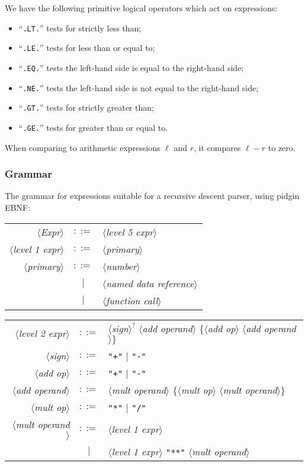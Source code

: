 We have the following primitive logical operators which act on expressions:
\begin{itemize}
\item ``\texttt{.LT.}'' tests for strictly less than;
\item ``\texttt{.LE.}'' tests for less than or equal to;
\item ``\texttt{.EQ.}'' tests the left-hand side is equal to the
  right-hand side;
\item ``\texttt{.NE.}'' tests the left-hand side is not equal to the
  right-hand side;
\item ``\texttt{.GT.}'' tests for strictly greater than;
\item ``\texttt{.GE.}'' tests for greater than or equal to.
\end{itemize}
When comparing to arithmetic expressions $\ell$ and $r$, it compares
$\ell-r$ to zero.

\subsubsection{Grammar}
The grammar for expressions suitable for a recursive descent parser,
using pidgin EBNF:

\begin{tabular}{rcl}
$\langle$\textit{Expr}$\rangle$ & $::=$ & $\langle$\textit{level 5 expr}$\rangle$\\
$\langle$\textit{level 1 expr}$\rangle$ & $::=$ & $\langle$\textit{primary}$\rangle$\\
$\langle$\textit{primary}$\rangle$ & $::=$ & $\langle$\textit{number}$\rangle$\\
  & $\mid$ & $\langle$\textit{named data reference}$\rangle$\\
  & $\mid$ & $\langle$\textit{function call}$\rangle$\\
\end{tabular}

\begin{tabular}{rcl}
  $\langle$\textit{level 2 expr}$\rangle$ & $::=$ &
  $\langle$\textit{sign}$\rangle^{?}$ $\langle$\textit{add operand}$\rangle$ 
  $\{\langle$\textit{add op}$\rangle$ $\langle$\textit{add operand}$\rangle\}$\\
  $\langle$\textit{sign}$\rangle$ & $::=$ & \texttt{"+"} $\mid$ \texttt{"-"}\\
  $\langle$\textit{add op}$\rangle$ & $::=$ & \texttt{"+"} $\mid$ \texttt{"-"}\\
  $\langle$\textit{add operand}$\rangle$ & $::=$ & $\langle$\textit{mult operand}$\rangle$  $\{\langle$\textit{mult op}$\rangle$ $\langle$\textit{mult operand}$\rangle\}$\\
  $\langle$\textit{mult op}$\rangle$ & $::=$ & \texttt{"*"} $\mid$ \texttt{"/"}\\
  $\langle$\textit{mult operand}$\rangle$ & $::=$ & $\langle$\textit{level 1 expr}$\rangle$ \\
  & $\mid$ & $\langle$\textit{level 1 expr}$\rangle$ \texttt{"**"} $\langle$\textit{mult operand}$\rangle$\\
\end{tabular}

